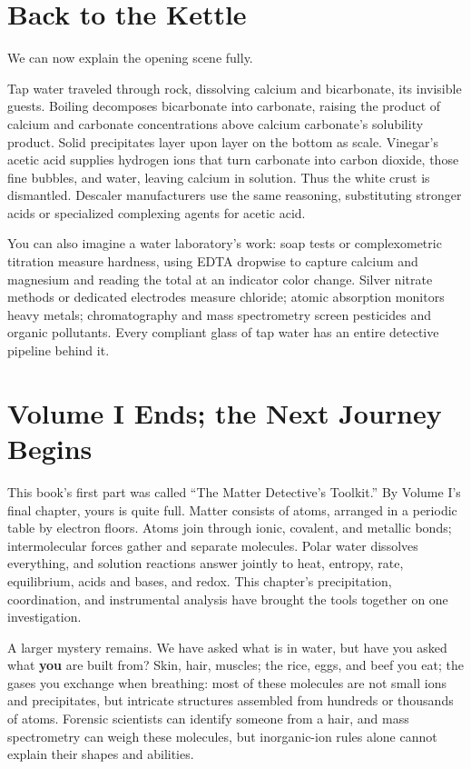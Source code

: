 \section{Back to the Kettle}

We can now explain the opening scene fully.

Tap water traveled through rock, dissolving calcium and bicarbonate, its invisible guests. Boiling decomposes bicarbonate into carbonate, raising the product of calcium and carbonate concentrations above calcium carbonate's solubility product. Solid precipitates layer upon layer on the bottom as scale. Vinegar's acetic acid supplies hydrogen ions that turn carbonate into carbon dioxide, those fine bubbles, and water, leaving calcium in solution. Thus the white crust is dismantled. Descaler manufacturers use the same reasoning, substituting stronger acids or specialized complexing agents for acetic acid.

You can also imagine a water laboratory's work: soap tests or complexometric titration measure hardness, using EDTA dropwise to capture calcium and magnesium and reading the total at an indicator color change. Silver nitrate methods or dedicated electrodes measure chloride; atomic absorption monitors heavy metals; chromatography and mass spectrometry screen pesticides and organic pollutants. Every compliant glass of tap water has an entire detective pipeline behind it.

\section{Volume I Ends; the Next Journey Begins}

This book's first part was called ``The Matter Detective's Toolkit.'' By Volume I's final chapter, yours is quite full. Matter consists of atoms, arranged in a periodic table by electron floors. Atoms join through ionic, covalent, and metallic bonds; intermolecular forces gather and separate molecules. Polar water dissolves everything, and solution reactions answer jointly to heat, entropy, rate, equilibrium, acids and bases, and redox. This chapter's precipitation, coordination, and instrumental analysis have brought the tools together on one investigation.

A larger mystery remains. We have asked what is in water, but have you asked what \textbf{you} are built from? Skin, hair, muscles; the rice, eggs, and beef you eat; the gases you exchange when breathing: most of these molecules are not small ions and precipitates, but intricate structures assembled from hundreds or thousands of atoms. Forensic scientists can identify someone from a hair, and mass spectrometry can weigh these molecules, but inorganic-ion rules alone cannot explain their shapes and abilities.

